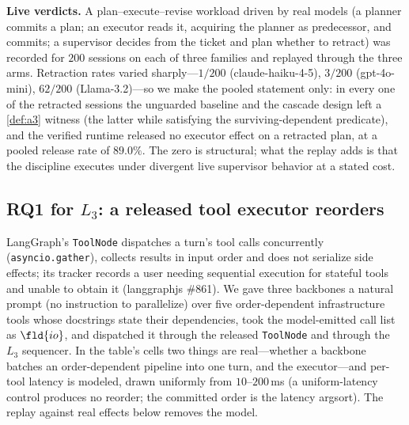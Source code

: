 \smallskip\noindent\textbf{Live verdicts.} A plan--execute--revise workload
driven by real models (a planner commits a plan; an executor reads it,
acquiring the planner as predecessor, and commits; a supervisor decides from
the ticket and plan whether to retract) was recorded for $200$ sessions on
each of three families and replayed through the three arms. Retraction rates
varied sharply---$1/200$ (claude-haiku-4-5), $3/200$ (gpt-4o-mini),
$62/200$ (Llama-3.2)---so we make the pooled statement only: in every one of
the \LiveLtwoRetractions{} retracted sessions the unguarded baseline and the
cascade design left a \cref{def:a3} witness (the latter while satisfying the
surviving-dependent predicate), and the verified runtime released no executor
effect on a retracted plan, at a pooled release rate of $89.0\%$. The zero is
structural; what the replay adds is that the discipline executes under
divergent live supervisor behavior at a stated cost.

\subsection{RQ1 for $L_3$: a released tool executor reorders}
\label{sec:a6-eval}
LangGraph's \texttt{ToolNode} dispatches a turn's tool calls concurrently
(\texttt{asyncio.gather}), collects results in input order and does not
serialize side effects; its tracker records a user needing sequential
execution for stateful tools and unable to obtain it (langgraphjs \#861). We
gave three backbones a natural prompt (no instruction to parallelize) over
five order-dependent infrastructure tools whose docstrings state their
dependencies, took the model-emitted call list as $\fld{io}$, and dispatched
it through the released \texttt{ToolNode} and through the $L_3$ sequencer.
In the table's cells two things are real---whether a backbone batches an
order-dependent pipeline into one turn, and the executor---and per-tool
latency is modeled, drawn uniformly from $10$--$200$\,ms (a uniform-latency
control produces no reorder; the committed order is the latency argsort).
The replay against real effects below removes the model.


